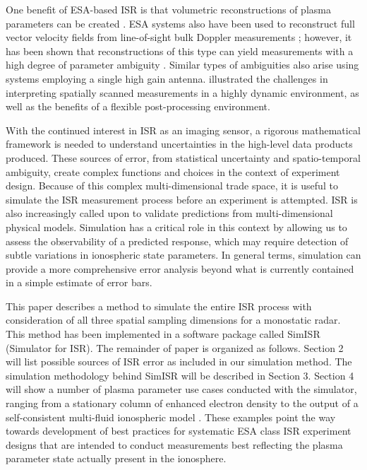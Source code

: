 \documentclass[draft,ras]{agutex}
\begin{document}
\begin{article}
One benefit of ESA-based ISR is that volumetric reconstructions of plasma parameters can be created \citep{Semeter2009738, Nicolls:2007ie, dahlgren2012di}. ESA systems also have been used to reconstruct full vector velocity fields from line-of-sight bulk Doppler measurements \citep{butler:imagingfregiondrifts,RDS:RDS20195}; however, it has been shown that reconstructions of this type can yield measurements with a high degree of parameter ambiguity \citep{Dahlgren:2012dq}. Similar types of ambiguities also arise using systems employing a single high gain antenna.  \citet{Semeter:2005fo} illustrated the challenges in interpreting spatially scanned measurements in a highly dynamic environment, as well as the benefits of a flexible post-processing environment.

With the continued interest in ISR as an imaging sensor, a rigorous mathematical framework is needed to understand uncertainties in the high-level data products produced.  These sources of error, from statistical uncertainty and spatio-temporal ambiguity, create complex functions and choices in the context of experiment design. Because of this complex multi-dimensional trade space, it is useful to simulate the ISR measurement process before an experiment is attempted.  ISR is also increasingly called upon to validate predictions from multi-dimensional physical models.  Simulation has a critical role in this context by allowing us to assess the observability of a predicted  response, which may require detection of subtle variations in ionospheric state parameters.   In general terms, simulation can provide a more comprehensive error analysis beyond what is currently contained in a simple estimate of error bars. 

This paper describes a method to simulate the entire ISR process with consideration of all three spatial sampling dimensions for a monostatic radar. This method has been implemented in a software package called SimISR (Simulator for ISR).  
The remainder of paper is organized as follows. Section 2 will list possible sources of ISR error as included in our simulation method. The simulation methodology behind SimISR will be described in Section 3. Section 4 will show a number of plasma parameter use cases conducted with the simulator, ranging from a stationary column of enhanced electron density to the output of a self-consistent multi-fluid ionospheric model \citep{semeter:plasmatransport2012}. 
These examples point the way towards development of best practices for systematic ESA class ISR experiment designs that are intended to conduct measurements best reflecting the plasma parameter state actually present in the ionosphere.


\end{article}
\end{document}
